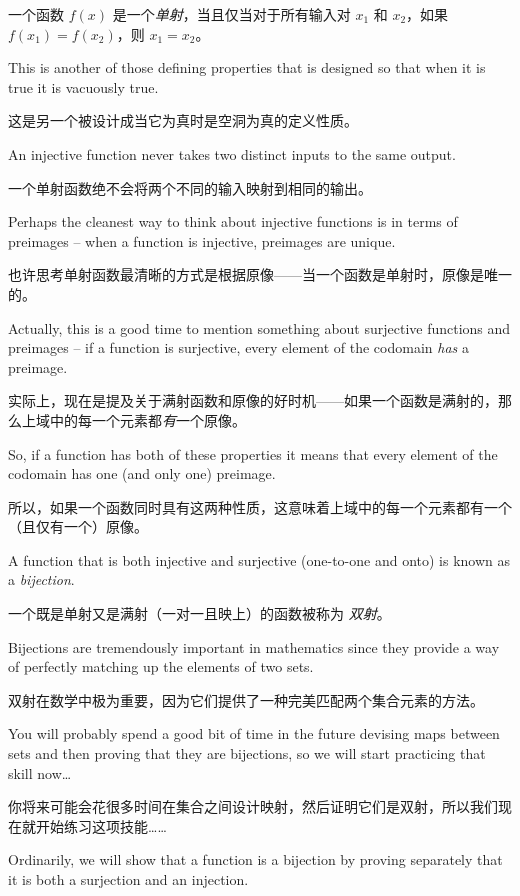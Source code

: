 \begin{defi}
一个函数 $f(x)$ 是一个\emph{单射}，当且仅当对于所有输入对 $x_1$ 和 $x_2$，如果 $f(x_1) = f(x_2)$，则 $x_1=x_2$。
\end{defi}

This is another of those defining properties that is designed so
that when it is true it is vacuously true.

这是另一个被设计成当它为真时是空洞为真的定义性质。

An injective function
never takes two distinct inputs to the same output.

一个单射函数绝不会将两个不同的输入映射到相同的输出。

Perhaps the 
cleanest way to think about injective functions is in terms of 
preimages -- when a function is injective, preimages are unique.

也许思考单射函数最清晰的方式是根据原像——当一个函数是单射时，原像是唯一的。

Actually, this is a good time to mention something about surjective
functions and preimages -- if a function is surjective, every element
of the codomain \emph{has} a preimage.

实际上，现在是提及关于满射函数和原像的好时机——如果一个函数是满射的，那么上域中的每一个元素都\emph{有}一个原像。

So, if a function has both 
of these properties it means that every element of the codomain
has one (and only one) preimage.

所以，如果一个函数同时具有这两种性质，这意味着上域中的每一个元素都有一个（且仅有一个）原像。

A function that is both injective and surjective (one-to-one and onto)
is known as a \emph{bijection}.

一个既是单射又是满射（一对一且映上）的函数被称为 \emph{双射}。

Bijections are tremendously
important in mathematics since they provide a way of perfectly matching
up the elements of two sets.

双射在数学中极为重要，因为它们提供了一种完美匹配两个集合元素的方法。

You will probably spend a good bit of time 
in the future devising maps between sets and then proving that they are
bijections, so we will start practicing that skill now\ldots  

你将来可能会花很多时间在集合之间设计映射，然后证明它们是双射，所以我们现在就开始练习这项技能……

Ordinarily, we will show that a function is a bijection by proving 
separately that it is both a surjection and an injection.

